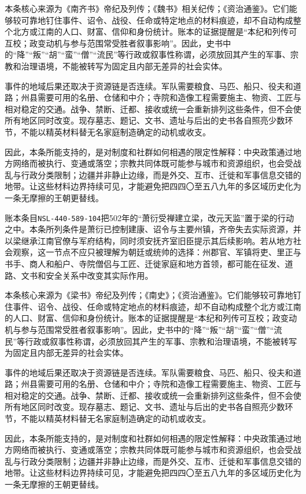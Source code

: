 本条核心来源为《南齐书》帝纪及列传；《魏书》相关纪传；《资治通鉴》。它们能够较可靠地钉住事件、诏令、战役、任命或特定地点的材料痕迹，却不自动构成整个北方或江南的人口、财富、信仰和身份统计。账本的证据提醒是“本纪和列传可互校；政变动机与参与范围常受胜者叙事影响”。因此，史书中的“降”“叛”“胡”“蛮”“僧”“流民”等行政或叙事性称谓，必须放回其产生的军事、宗教和治理语境，不能被转写为固定且内部无差异的社会实体。

事件的地域后果还取决于资源链是否连续。军队需要粮食、马匹、船只、役夫和道路；州县需要可用的名册、仓储和中介；寺院和造像工程需要施主、物资、工匠与相对稳定的交通。战争、禁断、迁都、接收或统一会重新排列这些条件，但不会使所有地区同时改变。现存墓志、题记、文书、遗址与后出的史书各自照亮少数环节，不能以精英材料替无名家庭制造确定的动机或收支。

因此，本条所能支持的，是对制度和社群如何相遇的限定性解释：中央政策通过地方网络而被执行、变通或落空；宗教共同体既可能参与城市和资源组织，也会受战乱与行政分类限制；边疆并非静止边缘，而是外交、互市、迁徙和军事信息交错的地带。让这些材料边界持续可见，才能避免把四四〇至五八九年的多区域历史化为一条无摩擦的王朝更替线。

账本条目\texttt{NSL-440-589-104}把502年的“萧衍受禅建立梁，改元天监”置于梁的行动之中。本条所列条件是萧衍已控制建康、诏令与主要州镇，齐帝失去实际资源，并以梁继承江南官僚与军府结构，同时须安抚齐室旧臣提示其后续影响。若从地方社会观察，这一节点不应只被理解为朝廷或统帅的选择：州郡官、军镇将吏、里正与书手、商人和船户、寺院僧侣与工匠、迁徙家庭和地方首领，都可能在征发、道路、文书和安全关系中改变其实际作用。

本条核心来源为《梁书》帝纪及列传；《南史》；《资治通鉴》。它们能够较可靠地钉住事件、诏令、战役、任命或特定地点的材料痕迹，却不自动构成整个北方或江南的人口、财富、信仰和身份统计。账本的证据提醒是“本纪和列传可互校；政变动机与参与范围常受胜者叙事影响”。因此，史书中的“降”“叛”“胡”“蛮”“僧”“流民”等行政或叙事性称谓，必须放回其产生的军事、宗教和治理语境，不能被转写为固定且内部无差异的社会实体。

事件的地域后果还取决于资源链是否连续。军队需要粮食、马匹、船只、役夫和道路；州县需要可用的名册、仓储和中介；寺院和造像工程需要施主、物资、工匠与相对稳定的交通。战争、禁断、迁都、接收或统一会重新排列这些条件，但不会使所有地区同时改变。现存墓志、题记、文书、遗址与后出的史书各自照亮少数环节，不能以精英材料替无名家庭制造确定的动机或收支。

因此，本条所能支持的，是对制度和社群如何相遇的限定性解释：中央政策通过地方网络而被执行、变通或落空；宗教共同体既可能参与城市和资源组织，也会受战乱与行政分类限制；边疆并非静止边缘，而是外交、互市、迁徙和军事信息交错的地带。让这些材料边界持续可见，才能避免把四四〇至五八九年的多区域历史化为一条无摩擦的王朝更替线。

